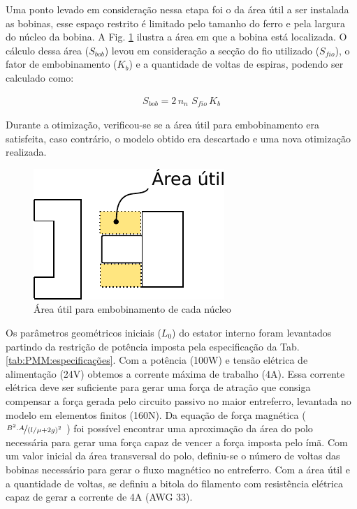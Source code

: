 Uma ponto levado em consideração nessa etapa foi o da área útil a ser instalada as bobinas, esse espaço restrito é limitado pelo tamanho do ferro e pela largura do núcleo da bobina. A Fig. \ref{fig:modelo_ativo_bobina} ilustra a área em que a bobina está localizada. O cálculo dessa área ($S_{bob}$) levou em consideração a secção do fio utilizado ($S_{fio}$), o fator de embobinamento ($K_b$) e a quantidade de voltas de espiras, podendo ser calculado como:

\begin{align}
	S_{bob} = 2 \, n_n \, \, S_{fio} \, K_b
\end{align}

Durante a otimização, verificou-se se a área útil para embobinamento era satisfeita, caso contrário, o modelo obtido era descartado e uma nova otimização realizada.

\begin{figure}[ht!]
\centering
\includegraphics[width=0.7\linewidth]{Figs/modelo_ativo_bobina}
\caption{Área útil para embobinamento de cada núcleo}
\label{fig:modelo_ativo_bobina}
\end{figure}

Os parâmetros geométricos iniciais ($L_0$) do estator interno foram levantados partindo da restrição de potência imposta pela especificação da Tab. \ref{tab:PMM:especificações}. Com a potência (100W) e tensão elétrica de alimentação (24V) obtemos a corrente máxima de trabalho (4A). Essa corrente elétrica deve ser suficiente para gerar uma força de atração que consiga compensar a força gerada pelo circuito passivo no maior entreferro, levantada no modelo em elementos finitos (160N). Da equação de força magnética ($\nicefrac{B^2.A}{(l/\mu +2g)^2}$ ) foi possível encontrar uma aproximação da área do polo necessária para gerar uma força capaz de vencer a força imposta pelo ímã. Com um valor inicial da área transversal do polo, definiu-se o número de voltas das bobinas necessário para gerar o fluxo magnético no entreferro. Com a área útil e a quantidade de voltas, se definiu a bitola do filamento com resistência elétrica capaz de gerar a corrente de 4A (AWG 33).

